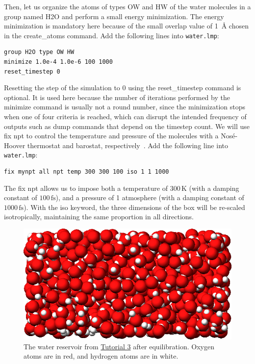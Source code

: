 \documentclass[9pt,tutorial]{livecoms}
\newcommand{\lmpcmd}[1]{\colorbox{listing}{\textcolor{command}{\small{#1}}}} %
\newcommand{\flecmd}[1]{\textcolor{command}{\texttt{#1}}} %
\begin{document}
Then, let us organize the atoms of types OW and HW of the water
molecules in a group named \lmpcmd{H2O} and perform a small energy
minimization.  The energy minimization is mandatory here because of the
small \lmpcmd{overlap} value of 1~Å chosen in the \lmpcmd{create\_atoms}
command.  Add the following lines into \flecmd{water.lmp}:
\begin{lstlisting}
group H2O type OW HW
minimize 1.0e-4 1.0e-6 100 1000
reset_timestep 0
\end{lstlisting}
Resetting the step of the simulation to 0 using the
\lmpcmd{reset\_timestep} command is optional.
{\color{blue}It is used here because the number of iterations performed by the \lmpcmd{minimize}
command is usually not a round number, since the minimization stops when one of
four criteria is reached, which can disrupt the intended frequency
of outputs such as \lmpcmd{dump} commands that depend on the timestep count.}
We will use \lmpcmd{fix npt} to control the temperature
and pressure of the molecules with a Nosé-Hoover thermostat and barostat,
respectively~\cite{nose1984unified, hoover1985canonical, martyna1994constant}.
Add the following line into \flecmd{water.lmp}:
\begin{lstlisting}
fix mynpt all npt temp 300 300 100 iso 1 1 1000
\end{lstlisting}
The \lmpcmd{fix npt} allows us to impose both a temperature of $300\,\text{K}$
(with a damping constant of $100\,\text{fs}$), and a pressure of 1 atmosphere
(with a damping constant of $1000\,\text{fs}$).  With the \lmpcmd{iso} keyword,
the three dimensions of the box will be re-scaled {\color{blue}isotropically,
maintaining the same proportion in all directions.}

\begin{figure}
\centering
\includegraphics[width=\linewidth]{PEG-water}
\caption{The water reservoir from \hyperref[all-atom-label]{Tutorial 3}
after equilibration.  Oxygen atoms are in red, and hydrogen atoms are in white.}
\label{fig:PEG-water}
\end{figure}
\end{document}
